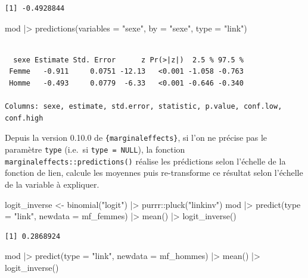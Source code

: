 \documentclass[
  letterpaper,
  DIV=11,
  numbers=noendperiod,
  oneside]{scrreprt}
\newenvironment{Shaded}{\begin{snugshade}}{\end{snugshade}}
\newcommand{\AttributeTok}[1]{\textcolor[rgb]{0.40,0.45,0.13}{#1}}
\newcommand{\FunctionTok}[1]{\textcolor[rgb]{0.28,0.35,0.67}{#1}}
\newcommand{\NormalTok}[1]{\textcolor[rgb]{0.00,0.23,0.31}{#1}}
\newcommand{\OtherTok}[1]{\textcolor[rgb]{0.00,0.23,0.31}{#1}}
\newcommand{\SpecialCharTok}[1]{\textcolor[rgb]{0.37,0.37,0.37}{#1}}
\newcommand{\StringTok}[1]{\textcolor[rgb]{0.13,0.47,0.30}{#1}}
\begin{document}
\begin{tcolorbox}
\begin{verbatim}
[1] -0.4928844
\end{verbatim}

\begin{Shaded}
\begin{Highlighting}[]
\NormalTok{mod }\SpecialCharTok{|\textgreater{}} 
  \FunctionTok{predictions}\NormalTok{(}\AttributeTok{variables =} \StringTok{"sexe"}\NormalTok{, }\AttributeTok{by =} \StringTok{"sexe"}\NormalTok{, }\AttributeTok{type =} \StringTok{"link"}\NormalTok{)}
\end{Highlighting}
\end{Shaded}

\begin{verbatim}

  sexe Estimate Std. Error      z Pr(>|z|)  2.5 % 97.5 %
 Femme   -0.911     0.0751 -12.13   <0.001 -1.058 -0.763
 Homme   -0.493     0.0779  -6.33   <0.001 -0.646 -0.340

Columns: sexe, estimate, std.error, statistic, p.value, conf.low, conf.high 
\end{verbatim}

Depuis la version 0.10.0 de \texttt{\{marginaleffects\}}, si l'on ne
précise pas le paramètre \texttt{type} (i.e.~si \texttt{type\ =\ NULL}),
la fonction \texttt{marginaleffects::predictions()} réalise les
prédictions selon l'échelle de la fonction de lien, calcule les moyennes
puis re-transforme ce résultat selon l'échelle de la variable à
expliquer.

\begin{Shaded}
\begin{Highlighting}[]
\NormalTok{logit\_inverse }\OtherTok{\textless{}{-}} \FunctionTok{binomial}\NormalTok{(}\StringTok{"logit"}\NormalTok{) }\SpecialCharTok{|\textgreater{}}\NormalTok{ purrr}\SpecialCharTok{::}\FunctionTok{pluck}\NormalTok{(}\StringTok{"linkinv"}\NormalTok{)}
\NormalTok{mod }\SpecialCharTok{|\textgreater{}} \FunctionTok{predict}\NormalTok{(}\AttributeTok{type =} \StringTok{"link"}\NormalTok{, }\AttributeTok{newdata =}\NormalTok{ mf\_femmes) }\SpecialCharTok{|\textgreater{}} \FunctionTok{mean}\NormalTok{() }\SpecialCharTok{|\textgreater{}} \FunctionTok{logit\_inverse}\NormalTok{()}
\end{Highlighting}
\end{Shaded}

\begin{verbatim}
[1] 0.2868924
\end{verbatim}

\begin{Shaded}
\begin{Highlighting}[]
\NormalTok{mod }\SpecialCharTok{|\textgreater{}} \FunctionTok{predict}\NormalTok{(}\AttributeTok{type =} \StringTok{"link"}\NormalTok{, }\AttributeTok{newdata =}\NormalTok{ mf\_hommes) }\SpecialCharTok{|\textgreater{}} \FunctionTok{mean}\NormalTok{() }\SpecialCharTok{|\textgreater{}} \FunctionTok{logit\_inverse}\NormalTok{()}
\end{Highlighting}
\end{Shaded}


\end{tcolorbox}
\end{document}
